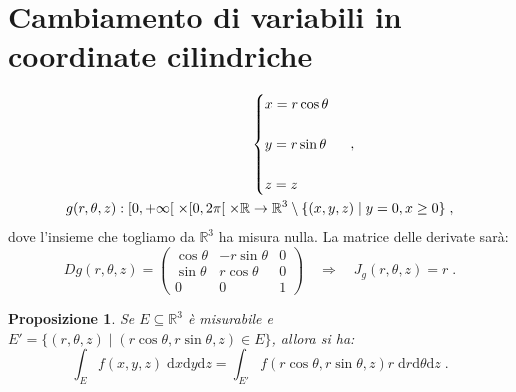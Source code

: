 \documentclass[a4paper,12pt]{report}
\theoremstyle{plain}
\newtheorem{prop}{Proposizione}[section]
\theoremstyle{definition}
\theoremstyle{remark}
\newcommand{\diff}[1]{\mathrm{d}#1}
\numberwithin{equation}{section}
\begin{document}
\section{Cambiamento di variabili in coordinate cilindriche}
\begin{align}
&\begin{cases}
x=r\cos\theta \\
\\
y=r\sin\theta \\
\\
z=z
\end{cases} \;,\notag \\
g(r,\theta,z):[0,+\infty[\;\times [0,2\pi[\;\times\mathbb{R}&\to \mathbb{R}^3\setminus\{(x,y,z)\;|\;y=0, x\ge 0\}\;,
\end{align}
dove l'insieme che togliamo da $\mathbb{R}^3$ ha misura nulla. La matrice delle derivate sarà:
\begin{equation}
Dg(r,\theta,z)=\left(\begin{matrix}
                      \cos\theta & -r\sin\theta & 0 \\
\sin\theta & r\cos\theta & 0 \\
0 & 0 & 1
                     \end{matrix}\right)\quad  \Longrightarrow\quad  J_g(r,\theta,z)=r\;.
\end{equation}
\begin{prop} Se $E\subseteq \mathbb{R}^3$ è misurabile e $E'=\{(r,\theta,z)\;|\;(r\cos\theta,r\sin\theta,z)\in E\}$, allora si ha:
\begin{equation}
\int_E f(x,y,z)\;\diff{x}\diff{y}\diff{z}=\int_{E'} f(r\cos\theta,r\sin\theta,z)r\;\diff{r}\diff{\theta}\diff{z}\;.
\end{equation}
\end{prop}
\end{document}
